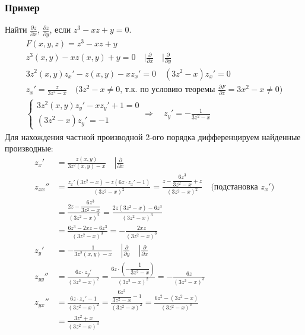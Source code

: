 \subsubsection*{Пример}
Найти $\frac{\partial z}{\partial x}$, $\frac{\partial z}{\partial y}$, если $z^3 - xz + y = 0$.
\begin{gather*}
	F(x,y,z) = z^3 - xz + y\\
	z^3(x,y) - xz(x,y) + y = 0 \quad \Big|\frac{\partial}{\partial x} \quad \Big|\frac{\partial}{\partial y}\\
	3z^2(x,y) z_x' - z(x,y) - x z_x' = 0 \quad (3z^2 - x) z_x' = 0\\
	z_x' = \frac{z}{3z^2 - x} \quad \text{($3z^2 - x \neq 0$, т.к. по условию теоремы $\frac{\partial F}{\partial z} = 3x^2 - x \neq 0$)}\\
	\begin{cases}
		3z^2(x,y) z_y' - xz_y' + 1 = 0\\
		(3z^2 - x)z_y' = -1
	\end{cases}
	\Rightarrow\quad z_y' = -\frac{1}{3z^2 - x}
\end{gather*}
Для нахождения частной производной 2-ого порядка дифференцируем найденные производные:
\begin{align*}
	z_x' &= \frac{z(x,y)}{3z^2(x,y) - x} \quad \left| \frac{\partial}{\partial x} \right. \\
	z_{xx}''
	&= \frac{z_x'(3z^2 - x) - z(6z \cdot z_x' - 1)}{(3z^2 - x)^2}
	= \frac{z - \dfrac{6z^3}{3z^2 - x} + z}{(3z^2 - x)^2}
	\quad \text{(подстановка $z_x'$)} \\
	&= \frac{2z - \dfrac{6z^3}{3z^2 - x}}{(3z^2 - x)^2}
	= \frac{2z(3z^2 - x) - 6z^3}{(3z^2 - x)^3} \\
	&= \frac{6z^3 - 2xz - 6z^3}{(3z^2 - x)^3}
	= -\frac{2xz}{(3z^2 - x)^3}\\
	z_y' &= -\frac{1}{3z^2(x,y) - x} \quad \left| \frac{\partial}{\partial y} \right. \quad \left| \frac{\partial}{\partial x} \right. \\
	z_{yy}''
	&= \frac{6z \cdot z_y'}{(3z^2 - x)^2}
	= \frac{6z \cdot \left(-\dfrac{1}{3z^2 - x}\right)}{(3z^2 - x)^2}
	= -\frac{6z}{(3z^2 - x)^3} \\
	z_{yx}''
	&= \frac{6z \cdot z_x' - 1}{(3z^2 - x)^2}
	= \frac{\dfrac{6z^2}{3z^2 - x} - 1}{(3z^2 - x)^2}
	= \frac{6z^2 - (3z^2 - x)}{(3z^2 - x)^3} \\
	&= \frac{3z^2 + x}{(3z^2 - x)^3}
\end{align*}

